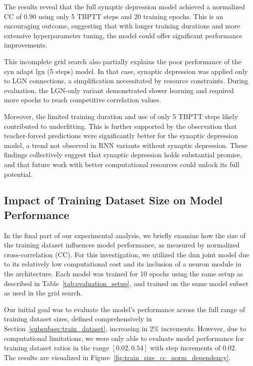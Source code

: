 The results reveal that the full synaptic depression model achieved a normalized CC of 0.90 using only 5 TBPTT steps and 20 training epochs. This is an encouraging outcome, suggesting that with longer training durations and more extensive hyperparameter tuning, the model could offer significant performance improvements.

This incomplete grid search also partially explains the poor performance of the syn adapt lgn (5 steps) model. In that case, synaptic depression was applied only to LGN connections, a simplification necessitated by resource constraints. During evaluation, the LGN-only variant demonstrated slower learning and required more epochs to reach competitive correlation values.

Moreover, the limited training duration and use of only 5 TBPTT steps likely contributed to underfitting. This is further supported by the observation that teacher-forced predictions were significantly better for the synaptic depression model, a trend not observed in RNN variants without synaptic depression. These findings collectively suggest that synaptic depression holds substantial promise, and that future work with better computational resources could unlock its full potential.

\subsection{Impact of Training Dataset Size on Model Performance}
\label{subsec:train_size_dataset_depencdency}
In the final part of our experimental analysis, we briefly examine how the size of the training dataset influences model performance, as measured by normalized cross-correlation (CC). For this investigation, we utilized the dnn joint model due to its relatively low computational cost and its inclusion of a neuron module in the architecture. Each model was trained for 10 epochs using the same setup as described in Table~\ref{tab:evaluation_setup}, and trained on the same model subset as used in the grid search.

Our initial goal was to evaluate the model's performance across the full range of training dataset sizes, defined comprehensively in Section~\ref{subsubsec:train_dataset}, increasing in 2\% increments. However, due to computational limitations, we were only able to evaluate model performance for training dataset ratios in the range $[0.02, 0.54]$ with step increments of 0.02. The results are visualized in Figure~\ref{fig:train_size_cc_norm_dependency}.

